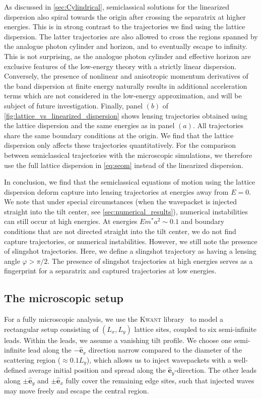 \documentclass[submission, Phys]{SciPost}
\begin{document}
As discussed in \cref{sec:Cylindrical}, semiclassical solutions for the linearized dispersion also spiral towards the origin after crossing the separatrix at higher energies.
This is in strong contrast to the trajectories we find using the lattice dispersion.
The latter trajectories are also allowed to cross the regions spanned by the analogue photon cylinder and horizon, and to eventually escape to infinity.
This is not surprising, as the  analogue photon cylinder and effective horizon are exclusive features of the low-energy theory with a strictly linear dispersion.
Conversely, the presence of nonlinear and anisotropic momentum derivatives of the band dispersion at finite energy naturally results in additional acceleration terms which are not considered in the low-energy approximation, and will be subject of future investigation.
Finally, panel $(b)$ of \cref{fig:lattice_vs_linearized_dispersion} shows lensing trajectories obtained using the lattice dispersion and the same energies as in panel $(a)$. All trajectories share the same boundary conditions at the origin.
We find that the lattice dispersion only affects these trajectories quantitatively.
For the comparison between semiclassical trajectories with the microscopic simulations, we therefore use the full lattice dispersion in \cref{eq:seom} instead of the linearized dispersion.

In conclusion, we find that the semiclassical equations of motion using the lattice dispersion deform capture into lensing trajectories at energies away from $E=0$.
We note that under special circumstances (when the wavepacket is injected straight into the tilt center, see \cref{sec:numerical_results}), numerical instabilities can still occur at high energies.
At energies $Em^*a^2\sim 0.1$ and boundary conditions that are not directed straight into the tilt center, we do not find capture trajectories, or numerical instabilities.
However, we still note the presence of slingshot trajectories.
Here, we define a slingshot trajectory as having a lensing angle $\varphi>\pi/2$.
The presence of slingshot trajectories at high energies serves as a fingerprint for a separatrix and captured trajectories at low energies.

\subsection{The microscopic setup}
For a fully microscopic analysis, we use the \textsc{Kwant} library~\cite{Groth2014} to model a rectangular setup consisting of $(L_x,L_y)$ lattice sites, coupled to six semi-infinite leads.
Within the leads, we assume a vanishing tilt profile.
We choose one semi-infinite lead along the $-\hat{\bm e}_x$ direction narrow compared to the diameter of the scattering region ($\approx 0.1L_y$), which allows us to inject wavepackets with a well-defined average initial position and spread along the $\hat{\bm e}_y$-direction.
The other leads along $\pm\hat{\bm e}_y$ and $\pm\hat{\bm e}_x$ fully cover the remaining edge sites, such that injected waves may move freely and escape the central region.
\end{document}
